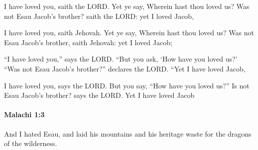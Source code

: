 			I have loved you, saith the LORD. Yet ye say, Wherein hast thou loved us? Was not Esau Jacob’s brother? saith the LORD: yet I loved Jacob,

			\begin{versebox}
					\item[BHS] 
					\item[LXX] 
					\item[ASV] I have loved you, saith Jehovah. Yet ye say, Wherein hast thou loved us? Was not Esau Jacob's brother, saith Jehovah: yet I loved Jacob;
					\item[NIV] “I have loved you,” says the LORD. “But you ask, ‘How have you loved us?’ “Was not Esau Jacob’s brother?” declares the LORD. “Yet I have loved Jacob,
					\item[NRSV] I have loved you, says the LORD. But you say, “How have you loved us?” Is not Esau Jacob’s brother? says the LORD. Yet I have loved Jacob
			\end{versebox}

		\paragraph{Malachi 1:3} %
			\label{MALACHI-1-3}

			And I hated Esau, and laid his mountains and his heritage waste for the dragons of the wilderness.

